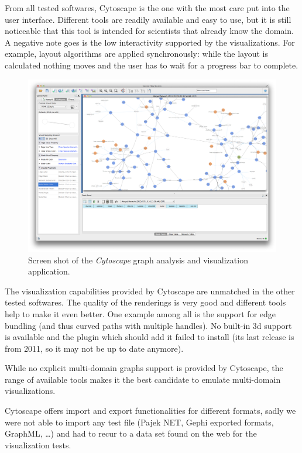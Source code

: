 From all tested softwares, Cytoscape is the one with the most care put into the user interface. Different tools are readily available and easy to use, but it is still noticeable that this tool is intended for scientists that already know the domain. A negative note goes is the low interactivity supported by the visualizations. For example, layout algorithms are applied synchronously: while the layout is calculated nothing moves and the user has to wait for a progress bar to complete.

\begin{figure}
  \centering
  \includegraphics[width=.8\linewidth]{images/cytoscape}
  \caption[Screen shot of Cytoscape.]{Screen shot of the \emph{Cytoscape} graph analysis and visualization application.}
  \label{fig:cytoscape}
\end{figure}

The visualization capabilities provided by Cytoscape are unmatched in the other tested softwares. The quality of the renderings is very good and different tools help to make it even better. One example among all is the support for edge bundling (and thus curved paths with multiple handles). No built-in \gls{3d} support is available and the plugin which should add it failed to install (its last release is from 2011, so it may not be up to date anymore).

While no explicit multi-domain graphs support is provided by Cytoscape, the range of available tools makes it the best candidate to emulate multi-domain visualizations.

Cytoscape offers import and export functionalities for different formats, sadly we were not able to import any test file (Pajek NET, Gephi exported formats, GraphML, \ldots) and had to recur to a data set found on the web for the visualization tests.

